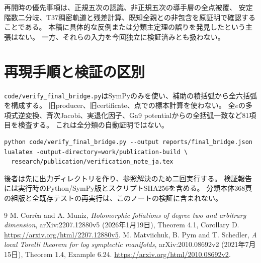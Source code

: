 \documentclass[a4paper,11pt]{ltjsarticle}
\theoremstyle{remark}\newtheorem{remark}[proposition]{注意}
\begin{document}
再開時の優先事項は、正規五次の認識、非正規五次の導手層の全点被覆、
安定階数二分岐、T37稠密軌道と残差計算、既知全親との非包含を原証明で確認することである。
本稿に具体的な反例または分類主定理の誤りを発見したという主張はない。
一方、それらの入力を今回独立に検証済みとも扱わない。

\section{再現手順と検証の区別}
\texttt{code/verify\_final\_bridge.py}はSymPyのみを使い、補助の積括弧から全六括弧を構成する。
旧producer、旧certificate、点での標本計算を使わない。
全$e$の多項式逆変換、斉次Jacobi、実退化因子、Ga9 potentialからの全括弧一致など81項目を検査する。
これは全分類の自動証明ではない。
\begin{verbatim}
python code/verify_final_bridge.py --output reports/final_bridge.json
lualatex -output-directory=work/publication-build \
  research/publication/verification_note_ja.tex
\end{verbatim}
後者は先に出力ディレクトリを作り、参照解決のため二回実行する。
検証報告には実行時のPython/SymPy版とスクリプトSHA256を含める。
分類本体368頁の組版と全既存テストの再実行は、このノートの検証に含まれない。

\begin{thebibliography}{9}
 M. Corr\^ea and A. Muniz,
\emph{Holomorphic foliations of degree two and arbitrary dimension},
arXiv:2207.12880v5 (2026年1月19日), Theorem 4.1, Corollary D.
\url{https://arxiv.org/html/2207.12880v5}.
 M. Matviichuk, B. Pym and T. Schedler,
\emph{A local Torelli theorem for log symplectic manifolds},
arXiv:2010.08692v2 (2021年7月15日), Theorem 1.4, Example 6.24.
\url{https://arxiv.org/html/2010.08692v2}.
\end{thebibliography}
\end{document}
